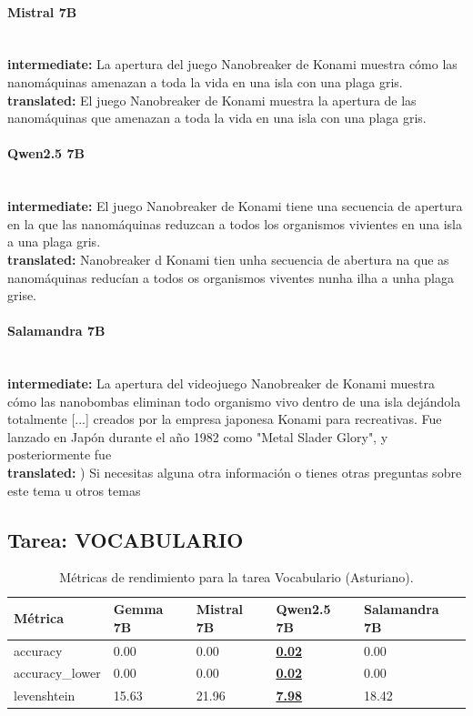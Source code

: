 \paragraph{Mistral 7B}~\\
\textbf{intermediate:} La apertura del juego Nanobreaker de Konami muestra cómo las nanomáquinas amenazan a toda la vida en una isla con una plaga gris.\\
\textbf{translated:} El juego Nanobreaker de Konami muestra la apertura de las nanomáquinas que amenazan a toda la vida en una isla con una plaga gris.

\paragraph{Qwen2.5 7B}~\\
\textbf{intermediate:} El juego Nanobreaker de Konami tiene una secuencia de apertura en la que las nanomáquinas reduzcan a todos los organismos vivientes en una isla a una plaga gris.\\
\textbf{translated:} Nanobreaker d Konami tien unha secuencia de abertura na que as nanomáquinas reducían a todos os organismos viventes nunha ilha a unha plaga grise.

\paragraph{Salamandra 7B}~\\
\textbf{intermediate:} La apertura del videojuego Nanobreaker de Konami muestra cómo las nanobombas eliminan todo organismo vivo dentro de una isla dejándola totalmente  [...]  creados por la empresa japonesa Konami para recreativas. Fue lanzado en Japón durante el año 1982 como "Metal Slader Glory", y posteriormente fue\\
\textbf{translated:} )       Si necesitas alguna otra información o tienes otras preguntas sobre este tema u otros temas

\subsection{Tarea: VOCABULARIO}\label{tarea-vocabulario}
\begin{longtable}[]{@{}lllll@{}}
\toprule\noalign{}
Métrica & Gemma 7B & Mistral 7B & Qwen2.5 7B & Salamandra 7B \\
\midrule\noalign{}
\endhead
\bottomrule\noalign{}
\caption{Métricas de rendimiento para la tarea Vocabulario (Asturiano).}
\label{tab:metricas_vocabulario_Asturiano}
\endlastfoot
accuracy & 0.00 & 0.00 & \textbf{\underline{0.02}} & 0.00 \\
accuracy\_lower & 0.00 & 0.00 & \textbf{\underline{0.02}} & 0.00 \\
levenshtein & 15.63 & 21.96 & \textbf{\underline{7.98}} & 18.42 \\
\end{longtable}

